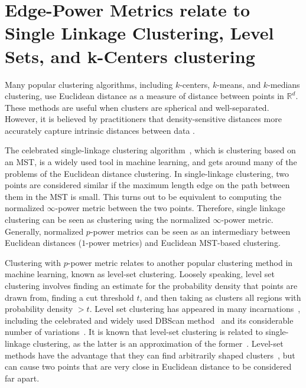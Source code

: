   \section{Edge-Power Metrics relate to Single Linkage Clustering, Level Sets, and k-Centers
  clustering}\label{ap:clustering-link}

  Many popular clustering algorithms, including $k$-centers, $k$-means,
  and $k$-medians clustering, use Euclidean distance as a measure of
  distance between points in $\mathbb{R}^d$. These methods are useful
  when clusters are spherical and well-separated. However, it is believed by
  practitioners that
  density-sensitive distances more accurately capture intrinsic
  distances between data \cite{alamgir12shortest}.

  The celebrated single-linkage clustering algorithm~\cite{Gower1969, Yaro2017},
  which is clustering based on an MST, is a widely used tool in
  machine learning, and gets around many of the problems of the
 Euclidean distance clustering. In single-linkage clustering,
   two points are considered similar if the maximum length
   edge on the path between them in the MST is small. This turns out to be equivalent to 
  computing the normalized $\infty$-power metric between the two
  points. Therefore, single linkage clustering can be seen
  as clustering using the normalized $\infty$-power metric.
  Generally, normalized $p$-power metrics can be seen as an
  intermediary between Euclidean distances ($1$-power metrics) and
  Euclidean MST-based clustering.

  Clustering with $p$-power metric relates to another popular
 clustering method in machine learning, known as level-set clustering.
  Loosely speaking, level set clustering involves finding an estimate
  for the probability density that points are drawn from, finding a
  cut threshold $t$, and then taking as clusters all regions with
  probability density $ > t$. Level set clustering
  has appeared in many incarnations~\cite{Wishart69, Stuetzle2003, Stuetzle2007}, including the celebrated and
  widely used DBScan method~\cite{Ester1996} and its
  considerable number of variations~\cite{OPTICS96}.
It is known
  that level-set clustering is related to single-linkage clustering, as
  the latter is an approximation of the former~\cite{Wishart69,
  Stuetzle2007}.  
  Level-set methods
  have the advantage that they can find arbitrarily shaped
  clusters~\cite{Ester1996}, but can cause two points that are very
  close in Euclidean distance to be considered far apart. 

